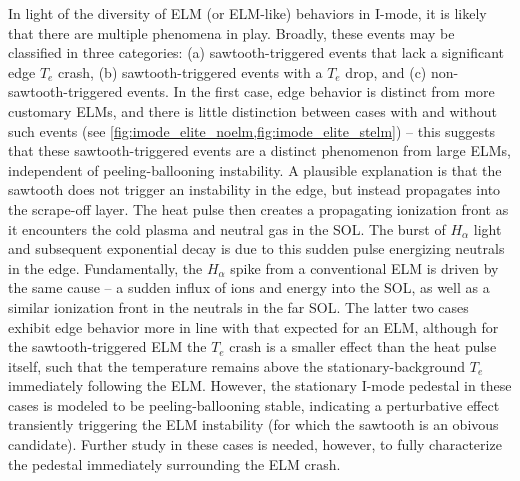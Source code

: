 In light of the diversity of ELM (or ELM-like) behaviors in I-mode, it is likely that there are multiple phenomena in play.  Broadly, these events may be classified in three categories: (a) sawtooth-triggered events that lack a significant edge $T_e$ crash, (b) sawtooth-triggered events with a $T_e$ drop, and (c) non-sawtooth-triggered events.  In the first case, edge behavior is distinct from more customary ELMs, and there is little distinction between cases with and without such events (see \cref{fig:imode_elite_noelm,fig:imode_elite_stelm}) -- this suggests that these sawtooth-triggered events are a distinct phenomenon from large ELMs, independent of peeling-ballooning instability.  A plausible explanation is that the sawtooth does not trigger an instability in the edge, but instead propagates into the scrape-off layer.  The heat pulse then creates a propagating ionization front as it encounters the cold plasma and neutral gas in the SOL.  The burst of $H_\alpha$ light and subsequent exponential decay is due to this sudden pulse energizing neutrals in the edge.  Fundamentally, the $H_\alpha$ spike from a conventional ELM is driven by the same cause -- a sudden influx of ions and energy into the SOL, as well as a similar ionization front in the neutrals in the far SOL.  The latter two cases exhibit edge behavior more in line with that expected for an ELM, although for the sawtooth-triggered ELM the $T_e$ crash is a smaller effect than the heat pulse itself, such that the temperature remains above the stationary-background $T_e$ immediately following the ELM.  However, the stationary I-mode pedestal in these cases is modeled to be peeling-ballooning stable, indicating a perturbative effect transiently triggering the ELM instability (for which the sawtooth is an obivous candidate).  Further study in these cases is needed, however, to fully characterize the pedestal immediately surrounding the ELM crash.\nicesectionending


